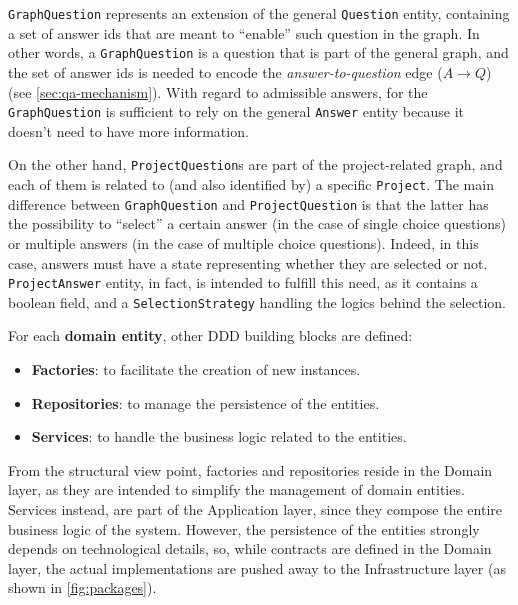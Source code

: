 \documentclass[12pt,a4paper,openright,twoside]{book}
\begin{document}
\texttt{GraphQuestion} represents an extension of the general \texttt{Question} entity, containing a set of answer ids that are meant to ``enable'' such question in the graph.
%
In other words, a \texttt{GraphQuestion} is a question that is part of the general graph, and the set of answer ids is needed to encode the \textit{answer-to-question} edge ($A \to Q$) (see \cref{sec:qa-mechanism}).
%
With regard to admissible answers, for the \texttt{GraphQuestion} is sufficient to rely on the general \texttt{Answer} entity because it doesn't need to have more information.

On the other hand, \texttt{ProjectQuestion}s are part of the project-related graph, and each of them is related to (and also identified by) a specific \texttt{Project}.
%
The main difference between \texttt{GraphQuestion} and \texttt{ProjectQuestion} is that the latter has the possibility to ``select'' a certain answer (in the case of single choice questions) or multiple answers (in the case of multiple choice questions).
%
Indeed, in this case, answers must have a state representing whether they are selected or not.
%
\texttt{ProjectAnswer} entity, in fact, is intended to fulfill this need, as it contains a boolean field, and a \texttt{SelectionStrategy} handling the logics behind the selection.

\vspace{1cm}
\noindent
For each \textbf{domain entity}, other \ac{DDD} building blocks are defined:

\begin{itemize}
    \item \textbf{Factories}: to facilitate the creation of new instances.
    \item \textbf{Repositories}: to manage the persistence of the entities.
    \item \textbf{Services}: to handle the business logic related to the entities.
\end{itemize}

From the structural view point, factories and repositories reside in the Domain layer, as they are intended to simplify the management of domain entities.
%
Services instead, are part of the Application layer, since they compose the entire business logic of the system.
%
However, the persistence of the entities strongly depends on technological details, so, while contracts are defined in the Domain layer, the actual implementations are pushed away to the Infrastructure layer (as shown in \cref{fig:packages}).
\end{document}

